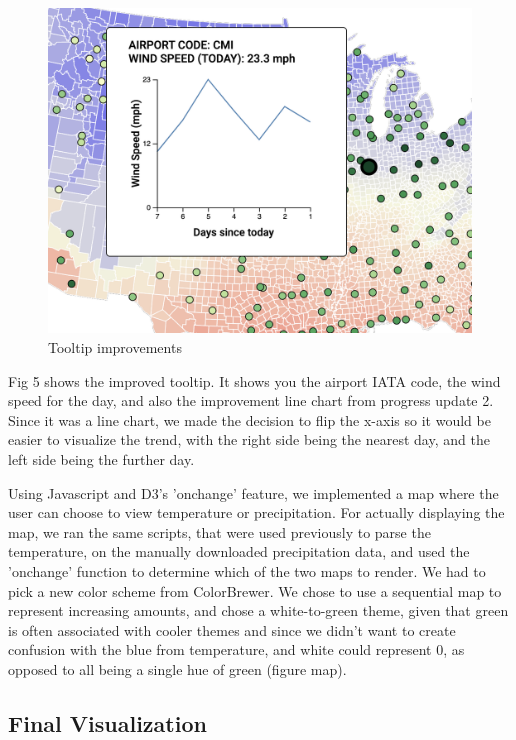 \documentclass[10pt,twocolumn,twoside]{opticajnl}
\begin{document}
\begin{figure}
    \centering
    \includegraphics[scale=0.4]{images/img6.png}
    \caption{Tooltip improvements}
\end{figure}

Fig 5 shows the improved tooltip. It shows you the airport IATA code, the wind speed for the day, and also the improvement line chart from progress update 2. Since it was a line chart, we made the decision to flip the x-axis so it would be easier to visualize the trend, with the right side being the nearest day, and the left side being the further day.

Using Javascript and D3's 'onchange' feature, we implemented a map where the user can choose to view temperature or precipitation. For actually displaying the map, we ran the same scripts, that were used previously to parse the temperature, on the manually downloaded precipitation data, and used the 'onchange' function to determine which of the two maps to render. We had to pick a new color scheme from ColorBrewer. We chose to use a sequential map to represent increasing amounts, and chose a white-to-green theme, given that green is often associated with cooler themes and since we didn't want to create confusion with the blue from temperature, and white could represent 0, as opposed to all being a single hue of green (figure map). 

\subsection {Final Visualization}
\end{document}
